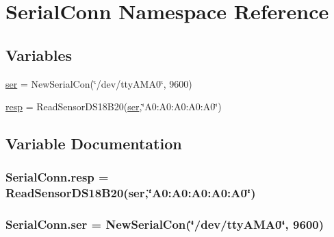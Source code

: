 \hypertarget{namespaceSerialConn}{}\section{Serial\+Conn Namespace Reference}
\label{namespaceSerialConn}
\subsection*{Variables}
\begin{DoxyCompactItemize}
\item 
\hyperlink{namespaceSerialConn_a55e53b967dd2b020787a575802da352c}{ser} = New\+Serial\+Con(\char`\"{}/dev/tty\+A\+M\+A0\char`\"{}, 9600)
\item 
\hyperlink{namespaceSerialConn_ae0e4c4c49ff306443cb816793cecd857}{resp} = Read\+Sensor\+D\+S18\+B20(\hyperlink{namespaceSerialConn_a55e53b967dd2b020787a575802da352c}{ser},\char`\"{}A0\+:\+A0\+:\+A0\+:\+A0\+:\+A0\char`\"{})
\end{DoxyCompactItemize}


\subsection{Variable Documentation}
\subsubsection[{\texorpdfstring{resp}{resp}}]{\setlength{\rightskip}{0pt plus 5cm}Serial\+Conn.\+resp = Read\+Sensor\+D\+S18\+B20({\bf ser},\char`\"{}A0\+:\+A0\+:\+A0\+:\+A0\+:\+A0\char`\"{})}\hypertarget{namespaceSerialConn_ae0e4c4c49ff306443cb816793cecd857}{}\label{namespaceSerialConn_ae0e4c4c49ff306443cb816793cecd857}
\subsubsection[{\texorpdfstring{ser}{ser}}]{\setlength{\rightskip}{0pt plus 5cm}Serial\+Conn.\+ser = New\+Serial\+Con(\char`\"{}/dev/tty\+A\+M\+A0\char`\"{}, 9600)}\hypertarget{namespaceSerialConn_a55e53b967dd2b020787a575802da352c}{}\label{namespaceSerialConn_a55e53b967dd2b020787a575802da352c}
